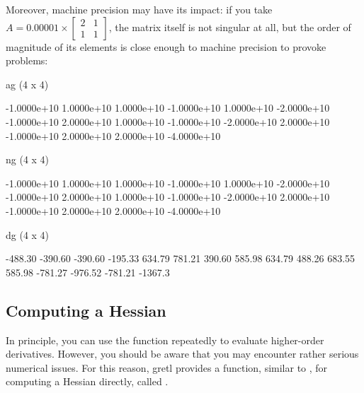 Moreover, machine precision may have its impact: if you take $A =
0.00001 \times \left[\begin{array}{cc} 2 & 1\\ 1 &
    1 \end{array}\right]$, the matrix itself is not singular at
all, but the order of magnitude of its elements is close enough to
machine precision to provoke problems:
\begin{code}
ag (4 x 4)

 -1.0000e+10   1.0000e+10   1.0000e+10  -1.0000e+10 
  1.0000e+10  -2.0000e+10  -1.0000e+10   2.0000e+10 
  1.0000e+10  -1.0000e+10  -2.0000e+10   2.0000e+10 
 -1.0000e+10   2.0000e+10   2.0000e+10  -4.0000e+10 

ng (4 x 4)

 -1.0000e+10   1.0000e+10   1.0000e+10  -1.0000e+10 
  1.0000e+10  -2.0000e+10  -1.0000e+10   2.0000e+10 
  1.0000e+10  -1.0000e+10  -2.0000e+10   2.0000e+10 
 -1.0000e+10   2.0000e+10   2.0000e+10  -4.0000e+10 

dg (4 x 4)

     -488.30      -390.60      -390.60      -195.33 
      634.79       781.21       390.60       585.98 
      634.79       488.26       683.55       585.98 
     -781.27      -976.52      -781.21      -1367.3 
\end{code}

\subsection{Computing a Hessian}
\label{sec:Hessian}

In principle, you can use the  function repeatedly to
evaluate higher-order derivatives. However, you should be aware that
you may encounter rather serious numerical issues. For this reason,
gretl provides a function, similar to , for computing
a Hessian directly, called .

